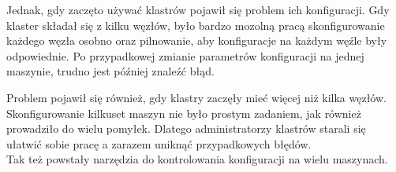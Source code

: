 Jednak, gdy zaczęto używać klastrów pojawił się problem ich konfiguracji. Gdy klaster składał się z kilku węzłów, było bardzo mozolną pracą skonfigurowanie każdego węzła osobno oraz pilnowanie, aby konfiguracje na każdym węźle były odpowiednie.
Po przypadkowej zmianie parametrów konfiguracji na jednej maszynie, trudno jest później znaleźć błąd.

Problem pojawił się również, gdy klastry zaczęły mieć więcej niż kilka węzłów. Skonfigurowanie kilkuset maszyn nie było prostym zadaniem, jak również prowadziło do wielu pomyłek. Dlatego administratorzy klastrów starali się ułatwić sobie pracę a zarazem uniknąć przypadkowych błędów.\\
Tak też powstały narzędzia do kontrolowania konfiguracji na wielu maszynach.
